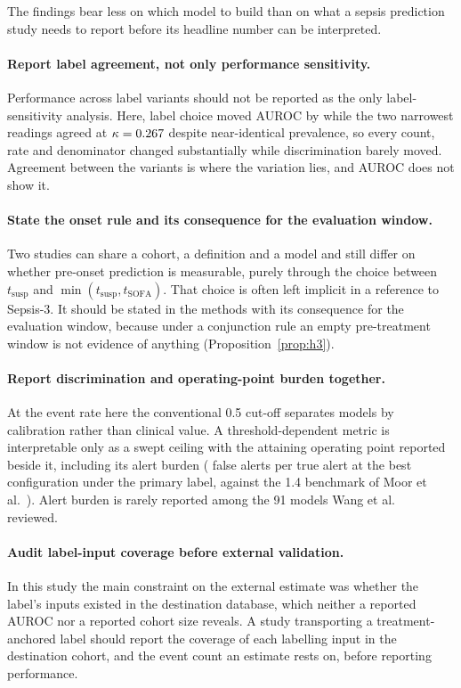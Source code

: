 The findings bear less on which model to build than on what a sepsis prediction
study needs to report before its headline number can be interpreted.

\paragraph{Report label agreement, not only performance sensitivity.}
Performance across label variants should not be reported as the only
label-sensitivity analysis. Here, label choice moved AUROC by \pcSpreadLabel{}
while the two narrowest readings agreed at $\kappa = 0.267$ despite
near-identical prevalence, so every count, rate and denominator changed
substantially while discrimination barely moved. Agreement between the
variants is where the variation lies, and AUROC does not show it.

\paragraph{State the onset rule and its consequence for the evaluation
window.} Two studies can share a cohort, a definition and a model and still
differ on whether pre-onset prediction is measurable, purely through the choice
between $t_{\text{susp}}$ and $\min(t_{\text{susp}}, t_{\text{SOFA}})$. That
choice is often left implicit in a reference to Sepsis-3. It should be stated
in the methods with its consequence for the evaluation window, because under a
conjunction rule an empty pre-treatment window is not evidence of anything
(Proposition~\ref{prop:h3}).

\paragraph{Report discrimination and operating-point burden together.} At the
event rate here the conventional 0.5 cut-off separates models by calibration
rather than clinical value. A threshold-dependent metric is interpretable only
as a swept ceiling with the attaining operating point reported beside it,
including its alert burden (\pcUtilityOptBurdenGbtB{} false alerts per true
alert at the best configuration under the primary label, against the 1.4
benchmark of Moor et al.\ \cite{moor2023review}). Alert burden is rarely
reported among the 91 models Wang et al.\ \cite{wang2025srpm} reviewed.

\paragraph{Audit label-input coverage before external validation.} In this
study the main constraint on the external estimate was whether the label's
inputs existed in the destination database, which neither a reported AUROC
nor a reported cohort size reveals. A study transporting a treatment-anchored
label should report the coverage of each labelling input in the destination
cohort, and the event count an estimate rests on, before reporting performance.

